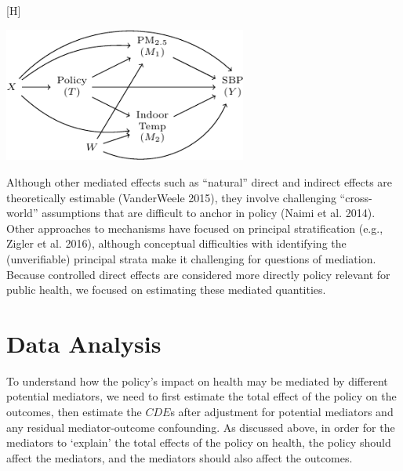 \documentclass[
  letterpaper,
  DIV=11,
  numbers=noendperiod]{scrartcl}
\makeatletter
\renewenvironment{figure}%
   {\renewcommand\familydefault\sfdefault
    \@float{figure}}
   {\end@float}
\makeatother
\begin{document}
\begin{figure}[H]

{\centering \includegraphics[width=0.6\textwidth,height=\textheight]{hei-report_files/figure-pdf/fig-dag1-1.pdf}

}

\caption{\label{fig-dag1}Hypothetical Directed Acyclic Graph showing
direct and indirect effects with outcome (\(Y\)), pre-treatment
covariates (\(X\)), policy (\(T\)), multiple mediators
(\(M_{1},M_{2}\)), as well as covariates for the mediators (\(W\)).}

\end{figure}

Although other mediated effects such as ``natural'' direct and indirect
effects are theoretically estimable (VanderWeele 2015), they involve
challenging ``cross-world'' assumptions that are difficult to anchor in
policy (Naimi et al. 2014). Other approaches to mechanisms have focused
on principal stratification (e.g., Zigler et al. 2016), although
conceptual difficulties with identifying the (unverifiable) principal
strata make it challenging for questions of mediation. Because
controlled direct effects are considered more directly policy relevant
for public health, we focused on estimating these mediated quantities.

\hypertarget{data-analysis}{%
\section{Data Analysis}\label{data-analysis}}

To understand how the policy's impact on health may be mediated by
different potential mediators, we need to first estimate the total
effect of the policy on the outcomes, then estimate the \(CDE\)s after
adjustment for potential mediators and any residual mediator-outcome
confounding. As discussed above, in order for the mediators to `explain'
the total effects of the policy on health, the policy should affect the
mediators, and the mediators should also affect the outcomes.
\end{document}
